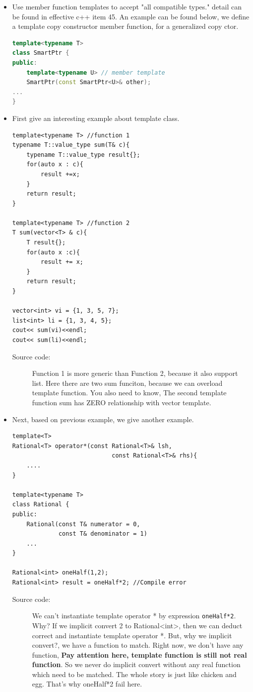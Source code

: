 \documentclass[a4paper,11pt,twoside]{book}
\begin{document}
\begin{itemize}
	\item Use member function templates to accept
	"all compatible types." detail can be found in effective c++ item 45. An example can be found below, we define a template copy constructor member function, for a generalized copy ctor.
	
\begin{lstlisting}[frame=single, language=c++]
template<typename T>
class SmartPtr {
public:
	template<typename U> // member template
	SmartPtr(const SmartPtr<U>& other); 
...
}
\end{lstlisting}
	
	\item First give an interesting example about template class. 
\begin{lstlisting}
template<typename T> //function 1
typename T::value_type sum(T& c){
	typename T::value_type result{};
	for(auto x : c){
		result +=x;
	}
	return result;
}

template<typename T> //function 2
T sum(vector<T> & c){
	T result{};
	for(auto x :c){
		result += x;
	}
	return result;
}

vector<int> vi = {1, 3, 5, 7};
list<int> li = {1, 3, 4, 5};
cout<< sum(vi)<<endl;
cout<< sum(li)<<endl;
\end{lstlisting}
\begin{description}
	\item[Source code:] Function 1 is more generic than Function 2, because it also support list. Here there are two sum funciton, because we can overload template function. You also need to know, The second template function sum has ZERO relationship with vector template.
\end{description}

	\item Next, based on previous example, we give another example.
\begin{lstlisting}
template<T>
Rational<T> operator*(const Rational<T>& lsh, 
							const Rational<T>& rhs){
	....
}

template<typename T>
class Rational {
public:
	Rational(const T& numerator = 0,
			 const T& denominator = 1)
	...
} 

Rational<int> oneHalf(1,2);
Rational<int> result = oneHalf*2; //Compile error
\end{lstlisting}
\begin{description}
	\item[Source code:] We can't instantiate template operator * by expression \texttt{oneHalf*2}. Why? If we implicit convert 2 to Rational<int>, then we can deduct correct and instantiate template operator *. But, why we implicit convert?, we have a function to match. Right now, we don't have any function, \textbf{Pay attention here, template function is still not real function}. So we never do implicit convert without any real function which need to be matched.  The whole story is just like chicken and egg. That's why oneHalf*2 fail here. 
\end{description}


\end{itemize}
\end{document}
